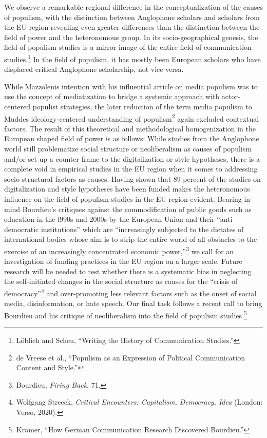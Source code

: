 \documentclass{tufte-handout}
\begin{document}
{{{{We observe a remarkable regional difference in the conceptualization of
the causes of populism, with the distinction between Anglophone scholars
and scholars from the EU region revealing even greater differences than
the distinction between the field of power and the heteronomous group.
In its socio-geographical genesis, the field of populism studies is a
mirror image of the entire field of communication studies.\footnote{Löblich
  and Scheu, ``Writing the History of Communication Studies.''} In the
field of populism, it has mostly been European scholars who have
displaced critical Anglophone scholarship, not vice versa.

While Mazzoleni\textquotesingle s intention with his influential article
on media populism was to use the concept of mediatization to bridge a
systemic approach with actor-centered populist strategies, the later
reduction of the term media populism to Mudde\textquotesingle s
ideology-centered understanding of populism\footnote{de Vreese et al.,
  ``Populism as an Expression of Political Communication Content and
  Style.''} again excluded contextual factors. The result of this
theoretical and methodological homogenization in the European shaped
field of power is as follows: While studies from the Anglophone world
still problematize social structure or neoliberalism as causes of
populism and/or set up a counter frame to the digitalization or style
hypotheses, there is a complete void in empirical studies in the EU
region when it comes to addressing socio-structural factors as causes.
Having shown that 89 percent of the studies on digitalization and style
hypotheses have been funded makes the heteronomous influence on the
field of populism studies in the EU region evident. Bearing in mind
Bourdieu's critiques against the commodification of public goods such as
education in the l990s and 2000s by the European Union and their
``anti-democratic institutions'' which are ``increasingly subjected to
the dictates of international bodies whose aim is to strip the entire
world of all obstacles to the exercise of an increasingly concentrated
economic power,''\footnote{Bourdieu, \emph{Firing Back}, 71.} we call
for an investigation of funding practices in the EU region on a larger
scale. Future research will be needed to test whether there is a
systematic bias in neglecting the self-initiated changes in the social
structure as causes for the ``crisis of democracy''\footnote{Wolfgang
  Streeck, \emph{Critical Encounters: Capitalism, Democracy, Idea}
  (London: Verso, 2020).} and over-promoting less relevant factors such
as the onset of social media, disinformation, or hate speech. Our final
task follows a recent call to bring Bourdieu and his critique of
neoliberalism into the field of populism studies.\footnote{Krämer, ``How
  German Communication Research Discovered Bourdieu.''}

}}}}
\end{document}
